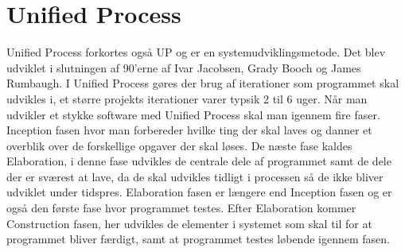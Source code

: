 \section{Unified Process}
Unified Process forkortes også UP og er en systemudviklingsmetode. Det blev udviklet i slutningen af 90'erne af Ivar Jacobsen, Grady Booch og James Rumbaugh. I Unified Process gøres der brug af iterationer som programmet skal udvikles i, et større projekts iterationer varer typsik 2 til 6 uger. Når man udvikler et stykke software med Unified Process skal man igennem fire faser. Inception fasen hvor man forbereder hvilke ting der skal laves og danner et overblik over de forskellige opgaver der skal løses. De næste fase kaldes Elaboration, i denne fase udvikles de centrale dele af programmet samt de dele der er sværest at lave, da de skal udvikles tidligt i processen så de ikke bliver udviklet under tidspres. Elaboration fasen er længere end Inception fasen og er også den første fase hvor programmet testes. Efter Elaboration kommer Construction fasen, her udvikles de elementer i systemet som skal til for at programmet bliver færdigt, samt at programmet testes løbende igennem fasen.